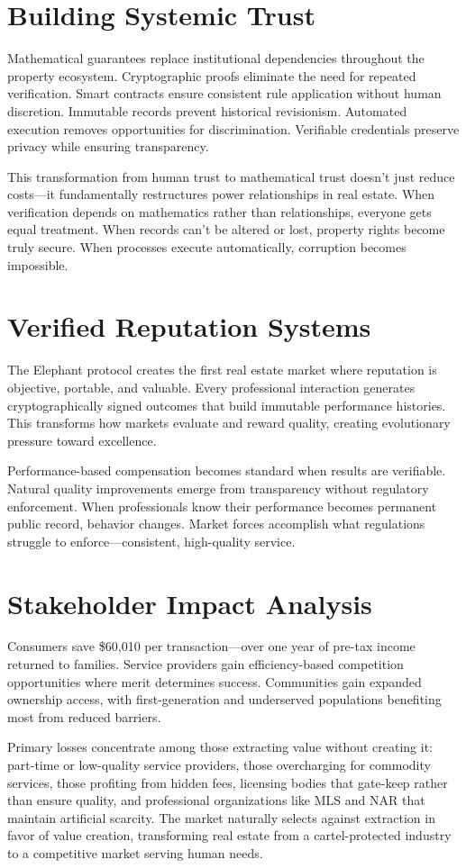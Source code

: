 \section{Building Systemic Trust}

Mathematical guarantees replace institutional dependencies throughout the property ecosystem. Cryptographic proofs eliminate the need for repeated verification. Smart contracts ensure consistent rule application without human discretion. Immutable records prevent historical revisionism. Automated execution removes opportunities for discrimination. Verifiable credentials preserve privacy while ensuring transparency.

This transformation from human trust to mathematical trust doesn't just reduce costs—it fundamentally restructures power relationships in real estate. When verification depends on mathematics rather than relationships, everyone gets equal treatment. When records can't be altered or lost, property rights become truly secure. When processes execute automatically, corruption becomes impossible.

\section{Verified Reputation Systems}

The Elephant protocol creates the first real estate market where reputation is objective, portable, and valuable. Every professional interaction generates cryptographically signed outcomes that build immutable performance histories. This transforms how markets evaluate and reward quality, creating evolutionary pressure toward excellence.

Performance-based compensation becomes standard when results are verifiable. Natural quality improvements emerge from transparency without regulatory enforcement. When professionals know their performance becomes permanent public record, behavior changes. Market forces accomplish what regulations struggle to enforce—consistent, high-quality service.

\section{Stakeholder Impact Analysis}

Consumers save \$60,010 per transaction—over one year of pre-tax income returned to families. Service providers gain efficiency-based competition opportunities where merit determines success. Communities gain expanded ownership access, with first-generation and underserved populations benefiting most from reduced barriers.

Primary losses concentrate among those extracting value without creating it: part-time or low-quality service providers, those overcharging for commodity services, those profiting from hidden fees, licensing bodies that gate-keep rather than ensure quality, and professional organizations like MLS and NAR that maintain artificial scarcity. The market naturally selects against extraction in favor of value creation, transforming real estate from a cartel-protected industry to a competitive market serving human needs.
